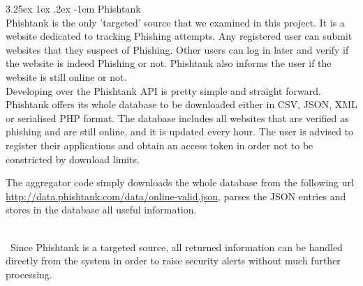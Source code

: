 \documentclass[12pt]{article}
\makeatletter
\renewcommand\paragraph{\@startsection{paragraph}{5}{\z@}%
  {3.25ex \@plus1ex \@minus.2ex}%
  {-1em}%
  {\normalfont\normalsize\bfseries}}
\makeatother
\begin{document}
\paragraph{Phishtank}
\hfill \break\\
Phishtank is the only 'targeted' source that we examined in this project. It is a website dedicated to tracking Phishing attempts. Any registered user can submit websites that they suspect of Phishing. Other users can log in later and verify if the website is indeed Phishing or not. Phishtank also informs the user if the website is still online or not.
\hfill \break\\
Developing over the Phishtank API is pretty simple and straight forward. Phishtank offers its whole database to be downloaded either in CSV, JSON, XML or serialised PHP format. The database includes all websites that are verified as phishing and are still online, and it is updated every hour. The user is advised to register their applications and obtain an access token in order not to be constricted by download limits.
\hfill \break\\
\parbox{\linewidth}{
The aggregator code simply downloads the whole database from the following url \url{http://data.phishtank.com/data/online-valid.json}, parses the JSON entries and stores in the database all useful information. 
}
\hfill \break\\\
Since Phishtank is a targeted source, all returned information can be handled directly from the system in order to raise security alerts without much further processing. 
 
\end{document}
